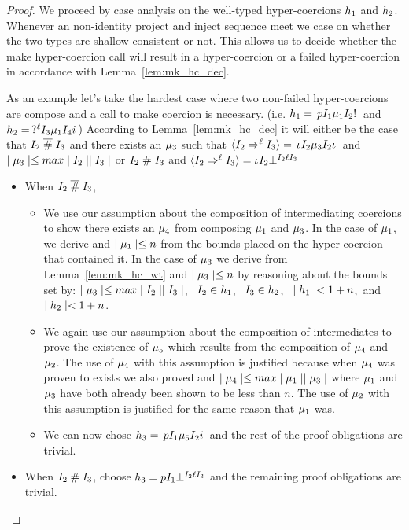 \documentclass[acmtog, authorversion, acmlarge]{acmart}
\begin{document}
\begin{proof}
  We proceed by case analysis on the well-typed hyper-coercions
  $h_1$ and $h_2$. Whenever an non-identity project and
  inject sequence meet we case on whether the two types are
  shallow-consistent or not. This allows us to decide whether
  the make hyper-coercion call will result in a hyper-coercion
  or a failed hyper-coercion in accordance with
  Lemma~\ref{lem:mk_hc_dec}.

  As an example let's take the hardest case where two non-failed
  hyper-coercions are compose and a call to make coercion is necessary.
  (i.e. $h_1 = \, p I_{1} \mu_1 I_{2}  ! \,$
  and $h_2 = \,  ?^{\ell} I_{3} \mu_1 I_{4} i \,$)
  According to Lemma~\ref{lem:mk_hc_dec} it will either be
  the case that
  $I_{2} \; \overline{\#} \; I_{3}$ and
  there exists an $\mu_3$ such that
  $\langle I_{2} \Rightarrow^{\ell} I_{3} \rangle = \, \iota_{} I_{2} \mu_3 I_{2} \iota_{} \,$
  and $\mid \mu_3 \mid \le max \mid I_{2} \mid\mid I_{3} \mid$
  or
  $I_{2} \; \# \; I_{3}$ and
  $\langle I_{2} \Rightarrow^{\ell} I_{3} \rangle = \iota_{} I_{2} \bot^{I_2 \ell I_{3}}$
  \begin{itemize}
  \item When $I_{2} \; \overline{\#} \; I_{3}$,
      \begin{itemize}
      \item We use our assumption about the composition of
        intermediating coercions to show there exists an $\mu_4$ from
        composing $\mu_1$ and $\mu_3$.  In the case of $\mu_1$,
        we derive  and $\mid \mu_1 \mid \le n$
        from the bounds placed on the hyper-coercion that contained it.
        In the case of $\mu_3$ we derive  from
        Lemma~\ref{lem:mk_hc_wt} and $\mid \mu_3 \mid \le n$ by
        reasoning about the bounds set by:
        $\mid \mu_3 \mid \le max \mid I_{2} \mid\mid I_{3} \mid$, \, 
        $I_2 \in h_1$, \,
        $I_3 \in h_2$, \,
        $\mid h_1 \mid < 1 + n$,\,
        and $\mid h_2 \mid < 1 + n$. 
      \item We again use our assumption about the composition
        of intermediates to prove the existence of $\mu_5$ which
        results from the composition of $\mu_4$ and $\mu_2$.
        The use of $\mu_4$ with this assumption is justified
        because when $\mu_4$ was proven to exists we also
        proved  and
        $\mid \mu_4 \mid \le max \mid \mu_1 \mid \mid \mu_3 \mid$ where
        $\mu_1$ and $\mu_3$ have both already been shown to be
        less than $n$. The use of $\mu_2$ with this assumption
        is justified for the same reason that $\mu_1$ was.
      \item We can now chose
        $h_3 = \, p I_1 \mu_5 I_2 i \,$ and the
        rest of the proof obligations are trivial. 
      \end{itemize}
    \item When $I_{2} \; \# \; I_{3}$, choose
      $h_3 = p I_{1} \bot^{I_2 \ell I_{3}}$ and the
      remaining proof obligations are trivial.
  \end{itemize}
\end{proof}
\end{document}
